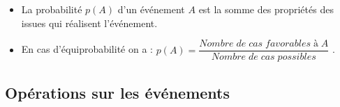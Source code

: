 \documentclass[12pt,a4paper]{article}
\begin{document}
	\begin{myprops}
		\begin{itemize}
			\item La probabilité $p(A)$ d'un événement $A$ est la somme des propriétés des issues qui réalisent l'événement.
			\item En cas d'équiprobabilité on a : $p(A) = \dfrac{Nombre\;de\; cas\; favorables\; à\; A}{Nombre\; de\; cas\; possibles}$ .
		\end{itemize}
		
	\end{myprops}
	
	
	
	
	
	
	
	\subsection{Opérations sur les événements}
	
	
	
	
	
	
	
	
	
	
\end{document}
